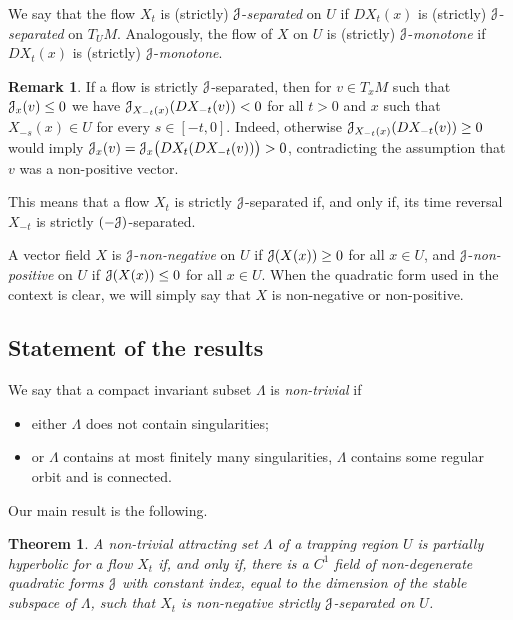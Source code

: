 \documentclass[12pt,reqno]{amsart}
\numberwithin{equation}{section}
\theoremstyle{plain}
\newtheorem{maintheorem}{Theorem}
\theoremstyle{definition}
\newtheorem{remark}[theorem]{Remark}
\newcommand{\J}{\EuScript{J}}
\begin{document}
We say that the flow $X_t$ is (strictly)
$\J$-\emph{separated} on $U$ if $DX_t(x)$ is (strictly)
$\J$-\emph{separated} on $T_UM$.
Analogously, the flow of $X$ on $U$ is (strictly) $\J$-\emph{monotone} if
$DX_t(x)$ is (strictly) $\J$-\emph{monotone}.

\begin{remark}\label{rmk:J-separated-C-}
  If a flow is strictly $\J$-separated, then for $v\in T_xM$
  such that $\J_x(v)\le0$ we have
  $\J_{X_{-t}(x)}(DX_{-t}(v))<0$ for all $t>0$ and $x$ such
  that $X_{-s}(x)\in U$ for every $s\in[-t,0]$. Indeed,
  otherwise $\J_{X_{-t}(x)}(DX_{-t}(v))\ge0$ would imply
  $\J_x(v)=\J_x\big(DX_t(DX_{-t}(v))\big)>0$, contradicting
  the assumption that $v$ was a non-positive vector.

  This means that a flow $X_t$ is strictly
    $\J$-separated if, and only if, its time reversal
    $X_{-t}$ is strictly $(-\J)$-separated. %
\end{remark}


A vector field $X$ is $\J$-\emph{non-negative} on $U$ if
$\J(X(x))\ge0$ for all $x\in U$, and
$\J$-\emph{non-positive} on $U$ if $\J(X(x))\leq 0$ for all
$x\in U$. When the quadratic form used in the context is
clear, we will simply say that $X$ is non-negative or
non-positive.

\subsection{Statement of the results}
\label{sec:j-separat-flows}

We say that a compact invariant subset $\Lambda$ is
\emph{non-trivial} if
\begin{itemize}
\item either $\Lambda$ does not contain singularities;
\item or $\Lambda$ contains at most finitely
many singularities, $\Lambda$ contains some
regular orbit and is connected.
\end{itemize}

Our main result is the following.

\begin{maintheorem}
  \label{mthm:Jseparated-parthyp}
  A non-trivial attracting set $\Lambda$ of a trapping
  region $U$ is partially hyperbolic for a flow $X_t$ if,
  and only if, there is a $C^1$ field of non-degenerate
  quadratic forms $\J$ with constant index, equal to the
  dimension of the stable subspace of $\Lambda$, such that
  $X_t$ is non-negative strictly $\J$-separated on $U$.
\end{maintheorem}
\end{document}
